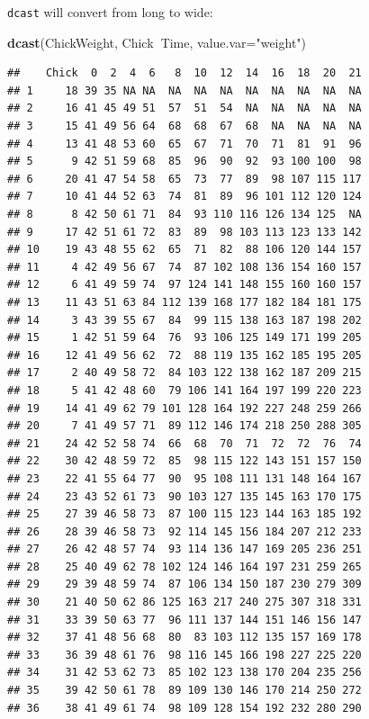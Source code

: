 \documentclass[]{book}
\newenvironment{Shaded}{\begin{snugshade}}{\end{snugshade}}
\newcommand{\DataTypeTok}[1]{\textcolor[rgb]{0.13,0.29,0.53}{#1}}
\newcommand{\KeywordTok}[1]{\textcolor[rgb]{0.13,0.29,0.53}{\textbf{#1}}}
\newcommand{\NormalTok}[1]{#1}
\newcommand{\OperatorTok}[1]{\textcolor[rgb]{0.81,0.36,0.00}{\textbf{#1}}}
\newcommand{\StringTok}[1]{\textcolor[rgb]{0.31,0.60,0.02}{#1}}
\theoremstyle{definition}
\theoremstyle{definition}
\theoremstyle{definition}
\theoremstyle{remark}
\begin{document}
\texttt{dcast} will convert from long to wide:

\begin{Shaded}
\begin{Highlighting}[]
\KeywordTok{dcast}\NormalTok{(ChickWeight, Chick}\OperatorTok{~}\NormalTok{Time, }\DataTypeTok{value.var=}\StringTok{"weight"}\NormalTok{)}
\end{Highlighting}
\end{Shaded}

\begin{verbatim}
##    Chick  0  2  4  6   8  10  12  14  16  18  20  21
## 1     18 39 35 NA NA  NA  NA  NA  NA  NA  NA  NA  NA
## 2     16 41 45 49 51  57  51  54  NA  NA  NA  NA  NA
## 3     15 41 49 56 64  68  68  67  68  NA  NA  NA  NA
## 4     13 41 48 53 60  65  67  71  70  71  81  91  96
## 5      9 42 51 59 68  85  96  90  92  93 100 100  98
## 6     20 41 47 54 58  65  73  77  89  98 107 115 117
## 7     10 41 44 52 63  74  81  89  96 101 112 120 124
## 8      8 42 50 61 71  84  93 110 116 126 134 125  NA
## 9     17 42 51 61 72  83  89  98 103 113 123 133 142
## 10    19 43 48 55 62  65  71  82  88 106 120 144 157
## 11     4 42 49 56 67  74  87 102 108 136 154 160 157
## 12     6 41 49 59 74  97 124 141 148 155 160 160 157
## 13    11 43 51 63 84 112 139 168 177 182 184 181 175
## 14     3 43 39 55 67  84  99 115 138 163 187 198 202
## 15     1 42 51 59 64  76  93 106 125 149 171 199 205
## 16    12 41 49 56 62  72  88 119 135 162 185 195 205
## 17     2 40 49 58 72  84 103 122 138 162 187 209 215
## 18     5 41 42 48 60  79 106 141 164 197 199 220 223
## 19    14 41 49 62 79 101 128 164 192 227 248 259 266
## 20     7 41 49 57 71  89 112 146 174 218 250 288 305
## 21    24 42 52 58 74  66  68  70  71  72  72  76  74
## 22    30 42 48 59 72  85  98 115 122 143 151 157 150
## 23    22 41 55 64 77  90  95 108 111 131 148 164 167
## 24    23 43 52 61 73  90 103 127 135 145 163 170 175
## 25    27 39 46 58 73  87 100 115 123 144 163 185 192
## 26    28 39 46 58 73  92 114 145 156 184 207 212 233
## 27    26 42 48 57 74  93 114 136 147 169 205 236 251
## 28    25 40 49 62 78 102 124 146 164 197 231 259 265
## 29    29 39 48 59 74  87 106 134 150 187 230 279 309
## 30    21 40 50 62 86 125 163 217 240 275 307 318 331
## 31    33 39 50 63 77  96 111 137 144 151 146 156 147
## 32    37 41 48 56 68  80  83 103 112 135 157 169 178
## 33    36 39 48 61 76  98 116 145 166 198 227 225 220
## 34    31 42 53 62 73  85 102 123 138 170 204 235 256
## 35    39 42 50 61 78  89 109 130 146 170 214 250 272
## 36    38 41 49 61 74  98 109 128 154 192 232 280 290

\end{verbatim}
\end{document}
